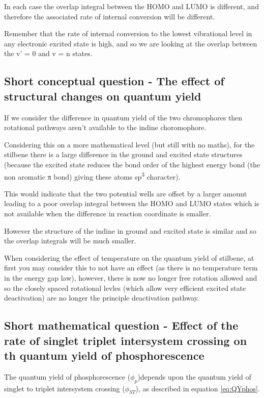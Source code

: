 \documentclass[
]{book}
\begin{document}
In each case the overlap integral between the HOMO and LUMO is different, and therefore the associated rate of internal conversion will be different.

Remember that the rate of internal conversion to the lowest vibrational level in any electronic excited state is high, and so we are looking at the overlap between the v' = 0 and v = n states.

\hypertarget{sec:structureQYans}{%
\subsection{Short conceptual question - The effect of structural changes on quantum yield}\label{sec:structureQYans}}

If we consider the difference in quantum yield of the two chromophores then rotational pathways aren't available to the indine choromophore.

Considering this on a more mathematical level (but still with no maths), for the stilbene there is a large difference in the ground and excited state structures (because the excited state reduces the bond order of the highest energy bond (the non aromatic π bond) giving these atoms sp\textsuperscript{3} character).

This would indicate that the two potential wells are offset by a larger amount leading to a poor overlap integral between the HOMO and LUMO states which is not available when the difference in reaction coordinate is smaller.

However the structure of the indine in ground and excited state is similar and so the overlap integrals will be much smaller.

When considering the effect of temperature on the quantum yield of stilbene, at first you may consider this to not have an effect (as there is no temperature term in the energy gap law), however, there is now no longer free rotation allowed and so the closely spaced rotational levles (which allow very efficient excited state deactivation) are no longer the principle deactivation pathway.

\hypertarget{sec:ratephosans}{%
\subsection{Short mathematical question - Effect of the rate of singlet triplet intersystem crossing on th quantum yield of phosphorescence}\label{sec:ratephosans}}

The quantum yield of phosphorescence (\(\phi_p\))depends upon the quantum yield of singlet to triplet intersystem crossing (\(\phi_{ST}\)), as described in equation \eqref{eq:QYphos}.
\end{document}
